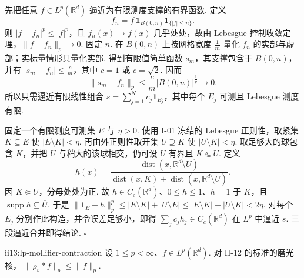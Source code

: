 \begin{FAProof}
先把任意 \(\displaystyle f\in L^p(\mathbb R^d)\) 逼近为有限测度支撑的有界函数. 定义
\[
f_n=f\,\mathbf1_{B(0,n)}\mathbf1_{\{|f|\leqslant n\}}.
\]
则 \(\displaystyle |f-f_n|^p\leqslant|f|^p\)，且 \(\displaystyle f_n(x)\to f(x)\) 几乎处处，故由 Lebesgue 控制收敛定理，\(\displaystyle\|f-f_n\|_p\to0\). 固定 \(\displaystyle n\). 在 \(\displaystyle B(0,n)\) 上按网格宽度 \(\displaystyle\frac{1}{m}\) 量化 \(\displaystyle f_n\) 的实部与虚部；实标量情形只量化实部. 得到有限值简单函数 \(\displaystyle s_m\)，其支撑包含于 \(\displaystyle B(0,n)\)，并有 \(\displaystyle |s_m-f_n|\leqslant \frac{c}{m}\)，其中 \(\displaystyle c=1\) 或 \(\displaystyle c=\sqrt2\). 因而
\[
\|s_m-f_n\|_p \leqslant \frac{c}{m}|B(0,n)|^{\frac{1}{p}} \longrightarrow0.
\]
所以只需逼近有限线性组合 \(\displaystyle s=\sum_{j=1}^Nc_j\mathbf1_{E_j}\)，其中每个 \(\displaystyle E_j\) 可测且 Lebesgue 测度有限.

固定一个有限测度可测集 \(\displaystyle E\) 与 \(\displaystyle\eta>0\). 使用 I-01 冻结的 Lebesgue 正则性，取紧集 \(\displaystyle K\subseteq E\) 使 \(\displaystyle|E\setminus K|<\eta\). 再由外正则性取开集 \(\displaystyle U\supseteq K\) 使 \(\displaystyle|U\setminus K|<\eta\). 取足够大的球包含 \(\displaystyle K\)，并把 \(\displaystyle U\) 与稍大的该球相交，仍可设 \(\displaystyle U\) 有界且 \(\displaystyle K\Subset U\). 定义
\[
h(x)
=
\frac{\operatorname{dist}(x,\mathbb R^d\setminus U)}
{\operatorname{dist}(x,K)+\operatorname{dist}(x,\mathbb R^d\setminus U)}.
\]
因 \(\displaystyle K\Subset U\)，分母处处为正. 故 \(\displaystyle h\in C_c(\mathbb R^d)\)、\(\displaystyle0\leqslant h\leqslant1\)、\(\displaystyle h=1\) 于 \(\displaystyle K\)，且 \(\displaystyle\operatorname{supp}h\subseteq\overline U\). 于是 \(\displaystyle \|\mathbf1_E-h\|_p^p \leqslant |E\setminus K|+|U\setminus E| \leqslant |E\setminus K|+|U\setminus K| <2\eta.\)
对每个 \(\displaystyle E_j\) 分别作此构造，并令误差足够小，即得 \(\displaystyle\sum_jc_jh_j\in C_c(\mathbb R^d)\) 在 \(\displaystyle L^p\) 中逼近 \(\displaystyle s\). 三段逼近合并即得结论.
\hfill\(\square\)
\end{FAProof}

\begin{FALemma}{ii13:lp-mollifier-contraction}
设 \(\displaystyle1\leqslant p<\infty\)、\(\displaystyle f\in L^p(\mathbb R^d)\). 对 II-12 的标准的磨光核， \(\displaystyle \|\rho_\varepsilon*f\|_p \leqslant \|f\|_p.\)
\end{FALemma}


